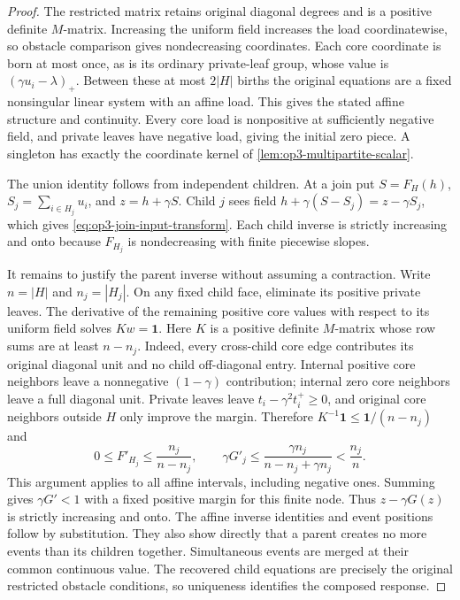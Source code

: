 \begin{proof}
The restricted matrix retains original diagonal degrees and is a positive
definite $M$-matrix. Increasing the uniform field increases the load
coordinatewise, so obstacle comparison gives nondecreasing coordinates.
Each core coordinate is born at most once, as is its ordinary private-leaf
group, whose value is $(\gamma u_i-\lambda)_+$. Between these at most
$2|H|$ births the original equations are a fixed nonsingular linear system
with an affine load. This gives the stated affine structure and continuity.
Every core load is nonpositive at sufficiently negative field, and private
leaves have negative load, giving the initial zero piece. A singleton has
exactly the coordinate kernel of \cref{lem:op3-multipartite-scalar}.

The union identity follows from independent children. At a join put
$S=F_H(h)$, $S_j=\sum_{i\in H_j}u_i$, and $z=h+\gamma S$.
Child $j$ sees field $h+\gamma(S-S_j)=z-\gamma S_j$, which gives
\cref{eq:op3-join-input-transform}. Each child inverse is strictly
increasing and onto because $F_{H_j}$ is nondecreasing with finite
piecewise slopes.

It remains to justify the parent inverse without assuming a contraction.
Write $n=|H|$ and $n_j=|H_j|$. On any fixed child face, eliminate its
positive private leaves. The derivative of the remaining positive core
values with respect to its uniform field solves $K w=\mathbf1$.
Here $K$ is a positive definite $M$-matrix whose row sums are at least
$n-n_j$. Indeed, every cross-child core edge contributes its original
diagonal unit and no child off-diagonal entry. Internal positive core
neighbors leave a nonnegative $(1-\gamma)$ contribution; internal zero
core neighbors leave a full diagonal unit. Private leaves leave
$t_i-\gamma^2t_i^{+}\geq0$, and original core neighbors outside $H$
only improve the margin. Therefore
$K^{-1}\mathbf1\leq\mathbf1/(n-n_j)$ and
\[
 0\leq F'_{H_j}\leq\frac{n_j}{n-n_j},\qquad
 \gamma G'_j\leq
 \frac{\gamma n_j}{n-n_j+\gamma n_j}<\frac{n_j}{n}.
\]
This argument applies to all affine intervals, including negative ones.
Summing gives $\gamma G'<1$ with a fixed positive margin for this finite
node. Thus $z-\gamma G(z)$ is strictly increasing and onto. The affine
inverse identities and event positions follow by substitution. They also
show directly that a parent creates no more events than its children
together. Simultaneous events are merged at their common continuous value.
The recovered child equations are precisely the original restricted
obstacle conditions, so uniqueness identifies the composed response.
\end{proof}

